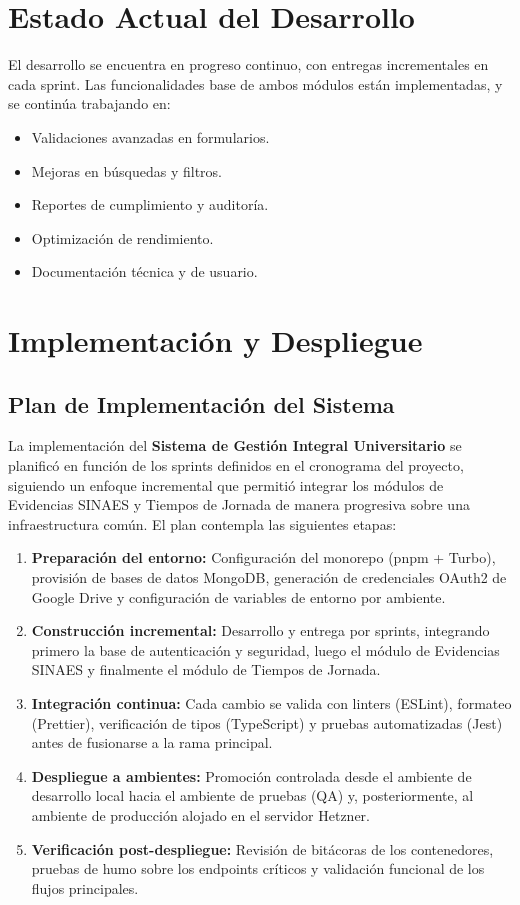 \section{Estado Actual del Desarrollo}

El desarrollo se encuentra en progreso continuo, con entregas incrementales en cada sprint. Las funcionalidades base de ambos módulos están implementadas, y se continúa trabajando en:

\begin{itemize}
    \item Validaciones avanzadas en formularios.
    \item Mejoras en búsquedas y filtros.
    \item Reportes de cumplimiento y auditoría.
    \item Optimización de rendimiento.
    \item Documentación técnica y de usuario.
\end{itemize}

\section{Implementación y Despliegue}

\subsection{Plan de Implementación del Sistema}

La implementación del \textbf{Sistema de Gestión Integral Universitario} se planificó en función de los sprints definidos en el cronograma del proyecto, siguiendo un enfoque incremental que permitió integrar los módulos de Evidencias SINAES y Tiempos de Jornada de manera progresiva sobre una infraestructura común. El plan contempla las siguientes etapas:

\begin{enumerate}
    \item \textbf{Preparación del entorno:} Configuración del monorepo (pnpm + Turbo), provisión de bases de datos MongoDB, generación de credenciales OAuth2 de Google Drive y configuración de variables de entorno por ambiente.
    \item \textbf{Construcción incremental:} Desarrollo y entrega por sprints, integrando primero la base de autenticación y seguridad, luego el módulo de Evidencias SINAES y finalmente el módulo de Tiempos de Jornada.
    \item \textbf{Integración continua:} Cada cambio se valida con linters (ESLint), formateo (Prettier), verificación de tipos (TypeScript) y pruebas automatizadas (Jest) antes de fusionarse a la rama principal.
    \item \textbf{Despliegue a ambientes:} Promoción controlada desde el ambiente de desarrollo local hacia el ambiente de pruebas (QA) y, posteriormente, al ambiente de producción alojado en el servidor Hetzner.
    \item \textbf{Verificación post-despliegue:} Revisión de bitácoras de los contenedores, pruebas de humo sobre los endpoints críticos y validación funcional de los flujos principales.
\end{enumerate}


